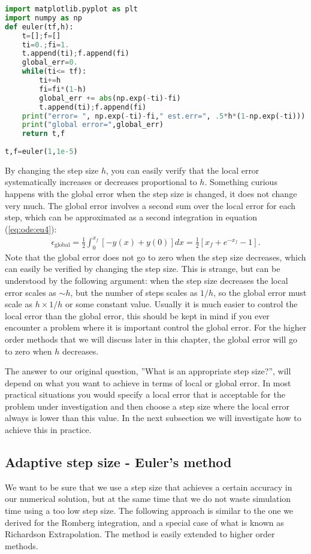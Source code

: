 \documentclass[graybox,sectrefs,envcountresetchap,open=right,final]{svmonodo}
\begin{document}
\begin{lstlisting}[language=python,style=blue1bar]
import matplotlib.pyplot as plt
import numpy as np
def euler(tf,h):
    t=[];f=[]
    ti=0.;fi=1.
    t.append(ti);f.append(fi)
    global_err=0.
    while(ti<= tf):
        ti+=h
        fi=fi*(1-h)
        global_err += abs(np.exp(-ti)-fi)
        t.append(ti);f.append(fi)
    print("error= ", np.exp(-ti)-fi," est.err=", .5*h*(1-np.exp(-ti)))
    print("global error=",global_err)
    return t,f
                                        
t,f=euler(1,1e-5)

\end{lstlisting}

By changing the step size $h$, you can easily verify that the local error systematically increases or decreases proportional to $h$.
Something curious happens with the global error when the 
step size is changed, it does not change very much. The global error involves a second sum over the local error for each step,
which can be approximated as a second integration in equation (\ref{eq:ode:eu4}):
\begin{align}
\epsilon_\text{global}=\frac{1}{2}\int_{0}^{x_f}\left[-y(x)+y(0)\right]dx=\frac{1}{2}\left[x_f+e^{-x_f}-1\right].\label{eq:ode:eu5}
\end{align}
Note that the global error does not go to zero when the step size decreases, which can easily be verified by changing the step size. This is strange, but can be understood
by the following argument: when the step size decreases the local error scales as $\sim h$, but the number of steps scales as $1/h$, so the global error must scale as $h\times 1/h$
or some constant value. Usually it is much easier to control the local error than the global error, this should be kept in mind if you ever encounter a problem where it is 
important control the global error. For the higher order methods that we will discuss later in this chapter, the global error will go to zero when $h$ decreases.   

The answer to our original question, ''What is an appropriate step size?'', will depend on what you want to achieve in terms of local or global error.
In most practical situations you would
specify a local error that is acceptable for the problem under investigation and then choose a step size where the local error always is lower than this value. In the 
next subsection we will investigate how to achieve this in practice.

\subsection{Adaptive step size - Euler's method}
We want to be sure that we use a step size that achieves a certain accuracy in our numerical solution, but at
the same time that we do not waste simulation time using a too low step size. The following approach is similar to the one we derived for the Romberg integration, and
a special case of what is known as Richardson Extrapolation. The method is easily extended to higher order methods. 
\end{document}
